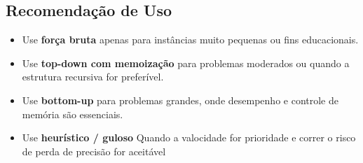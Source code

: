 \subsection*{Recomendação de Uso}

\begin{itemize}
    \item Use \textbf{força bruta} apenas para instâncias muito pequenas ou fins educacionais.
    \item Use \textbf{top-down com memoização} para problemas moderados ou quando a estrutura recursiva for preferível.
    \item Use \textbf{bottom-up} para problemas grandes, onde desempenho e controle de memória são essenciais.
    \item Use \textbf{heurístico / guloso} Quando a valocidade for prioridade e correr o risco de perda de precisão for aceitável
\end{itemize}